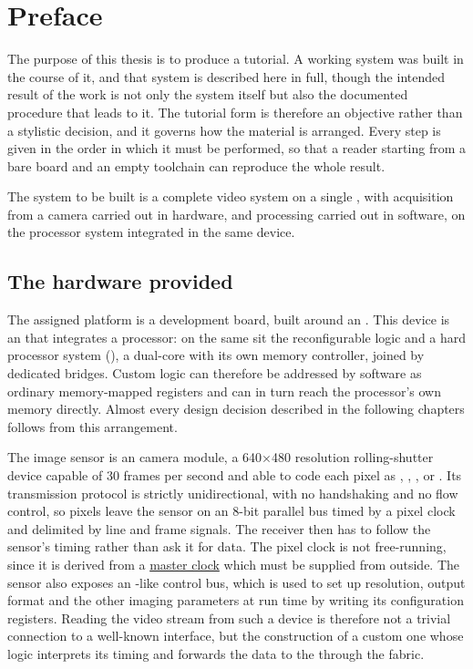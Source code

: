 \chapter{Preface}
\label{chap:preface}

The purpose of this thesis is to produce a tutorial. A working system was built in the course of it, and that system is described here in full, though the intended result of the work is not only the system itself but also the documented procedure that leads to it. The tutorial form is therefore an objective rather than a stylistic decision, and it governs how the material is arranged. Every step is given in the order in which it must be performed, so that a reader starting from a bare board and an empty toolchain can reproduce the whole result.

The system to be built is a complete video system on a single , with acquisition from a camera carried out in hardware, and processing carried out in software, on the processor system integrated in the same device.

\section{The hardware provided}

The assigned platform is a  development board, built around an . This device is an  that integrates a processor: on the same  sit the reconfigurable logic and a hard processor system (), a dual-core  with its own  memory controller, joined by dedicated  bridges. Custom logic can therefore be addressed by software as ordinary memory-mapped registers and can in turn reach the processor's own  memory directly. Almost every design decision described in the following chapters follows from this arrangement.

The image sensor is an  camera module, a 640$\times$480 resolution  rolling-shutter device capable of 30 frames per second and able to code each pixel as , , ,  or . Its transmission protocol is strictly unidirectional, with no handshaking and no flow control, so pixels leave the sensor on an 8-bit parallel bus timed by a pixel clock and delimited by line and frame signals. The receiver then has to follow the sensor's timing rather than ask it for data. The pixel clock is not free-running, since it is derived from a \uline{master clock} which must be supplied from outside. The sensor also exposes an -like control bus, which is used to set up resolution, output format and the other imaging parameters at run time by writing its configuration registers. Reading the video stream from such a device is therefore not a trivial connection to a well-known interface, but the construction of a custom one whose logic interprets its timing and forwards the data to the  through the  fabric.

